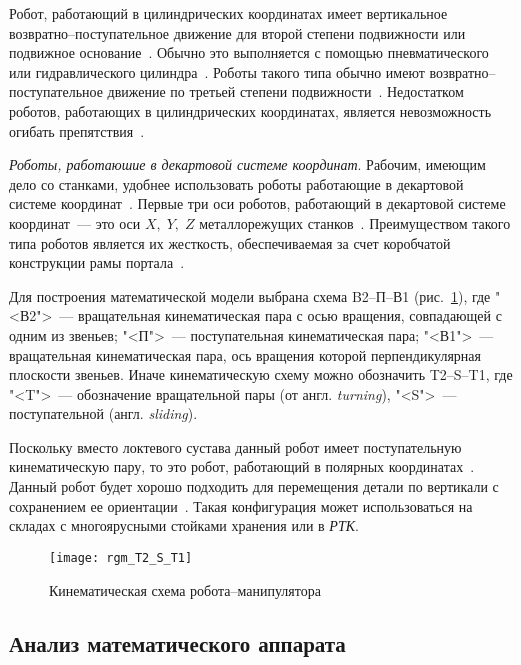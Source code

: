 \documentclass[oneside, final, 14pt]{extarticle}
\begin{document}
Робот, работающий в цилиндрических координатах имеет вертикальное возвратно--поступательное движение для второй степени подвижности или подвижное основание~\cite{asfal:rob_auto}.
Обычно это выполняется с помощью пневматического или гидравлического цилиндра~\cite{asfal:rob_auto}.
Роботы такого типа обычно имеют возвратно--поступательное движение по третьей степени подвижности~\cite{asfal:rob_auto}.
Недостатком роботов, работающих в цилиндрических координатах, является невозможность огибать препятствия~\cite{asfal:rob_auto}.
\par
{\itshape Роботы, работаюшие в декартовой системе координат}.
Рабочим, имеющим дело со станками, удобнее использовать роботы работающие в декартовой системе координат~\cite{asfal:rob_auto}.
Первые три оси роботов, работающий в декартовой системе координат~--- это оси \(X,\;Y,\;Z\) металлорежущих станков~\cite{asfal:rob_auto}.
Преимуществом такого типа роботов является их жесткость, обеспечиваемая за счет коробчатой конструкции рамы портала~\cite{asfal:rob_auto}.
\par
Для построения математической модели выбрана схема B2--П--В1 (рис.~\ref{i:rgm_T2_S_T1}), где "<В2">~--- вращательная кинематическая пара с осью вращения, совпадающей с одним из звеньев; "<П">~--- поступательная кинематическая пара; "<В1">~--- вращательная кинематическая пара, ось вращения которой перпендикулярная плоскости звеньев.
Иначе кинематическую схему можно обозначить T2--S--T1, где "<T">~--- обозначение вращательной пары (от англ. {\itshape turning}), "<S">~--- поступательной (англ. {\itshape sliding}).
\par
Поскольку вместо локтевого сустава данный робот имеет поступательную кинематическую пару, то это робот, работающий в полярных координатах~\cite{asfal:rob_auto}.
Данный робот будет хорошо подходить для перемещения детали по вертикали с сохранением ее ориентации~\cite{asfal:rob_auto}.
Такая конфигурация может использоваться на складах с многоярусными стойками хранения или в {\itshape РТК}.
\begin{figure}[t]
  \centering
  \texttt{[image: rgm\_T2\_S\_T1]}
  \caption{Кинематическая схема робота--манипулятора}
  \label{i:rgm_T2_S_T1}
\end{figure}

\subsection{Анализ математического аппарата}
\label{sec:an_mat_ap}
\end{document}
